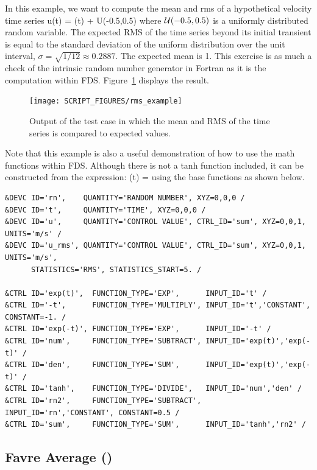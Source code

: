 \documentclass[11pt]{book}
\begin{document}
In this example, we want to compute the mean and rms of a hypothetical velocity time series
\be
   u(t) = \tanh(t) + {\cal U}(-0.5,0.5)
\ee
where ${\cal U}(-0.5,0.5)$ is a uniformly distributed random variable. The expected RMS of the time series beyond its initial transient is equal to the standard deviation of the uniform distribution over the unit interval, $\sigma=\sqrt{1/12}\approx 0.2887$. The expected mean is 1. This exercise is as much a check of the intrinsic random number generator in Fortran as it is the computation within FDS. Figure~\ref{rms_example_plot} displays the result.
\begin{figure}[h!]
\centering
\texttt{[image: SCRIPT\_FIGURES/rms\_example]}
\caption[Sample case ]{Output of the  test case in which the mean and RMS of the time series is compared to expected values.}
\label{rms_example_plot}
\end{figure}
Note that this example is also a useful demonstration of how to use the math functions within FDS. Although there is not a tanh function included, it can be constructed from the expression:
\be
   \tanh(t) = 
\ee
using the base functions as shown below.
\begin{lstlisting}
&DEVC ID='rn',    QUANTITY='RANDOM NUMBER', XYZ=0,0,0 /
&DEVC ID='t',     QUANTITY='TIME', XYZ=0,0,0 /
&DEVC ID='u',     QUANTITY='CONTROL VALUE', CTRL_ID='sum', XYZ=0,0,1, UNITS='m/s' /
&DEVC ID='u_rms', QUANTITY='CONTROL VALUE', CTRL_ID='sum', XYZ=0,0,1, UNITS='m/s',
      STATISTICS='RMS', STATISTICS_START=5. /

&CTRL ID='exp(t)',  FUNCTION_TYPE='EXP',      INPUT_ID='t' /
&CTRL ID='-t',      FUNCTION_TYPE='MULTIPLY', INPUT_ID='t','CONSTANT', CONSTANT=-1. /
&CTRL ID='exp(-t)', FUNCTION_TYPE='EXP',      INPUT_ID='-t' /
&CTRL ID='num',     FUNCTION_TYPE='SUBTRACT', INPUT_ID='exp(t)','exp(-t)' /
&CTRL ID='den',     FUNCTION_TYPE='SUM',      INPUT_ID='exp(t)','exp(-t)' /
&CTRL ID='tanh',    FUNCTION_TYPE='DIVIDE',   INPUT_ID='num','den' /
&CTRL ID='rn2',     FUNCTION_TYPE='SUBTRACT', INPUT_ID='rn','CONSTANT', CONSTANT=0.5 /
&CTRL ID='sum',     FUNCTION_TYPE='SUM',      INPUT_ID='tanh','rn2' /
\end{lstlisting}

\subsection{Favre Average (\texorpdfstring{}{shunn3\_FavreZ})}
\label{sec:favre_average}
\end{document}
